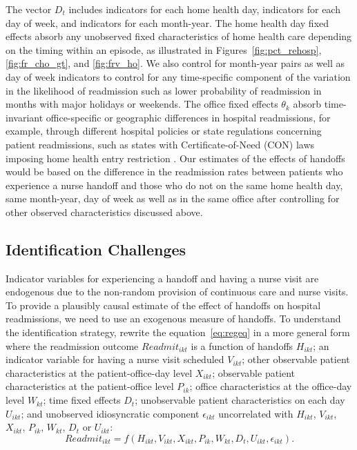 \documentclass[final,12pt, notitlepage]{article}
\begin{document}
The vector $D_t$ includes indicators for each home health day, indicators for each day of week, and indicators for each month-year.
The home health day fixed effects absorb any unobserved fixed characteristics of home health care depending on the timing within an episode, as illustrated in Figures~\ref{fig:pct_rehosp}, \ref{fig:fr_cho_gt}, and \ref{fig:frv_ho}.
We also control for month-year pairs as well as day of week indicators to control for any time-specific component of the variation in the likelihood of readmission such as lower probability of readmission in months with major holidays or weekends.
The office fixed effects $\theta_k$ absorb time-invariant office-specific or geographic differences in hospital readmissions, for example, through different hospital policies or state regulations concerning patient readmissions, such as states with Certificate-of-Need (CON) laws imposing home health entry restriction \citep{Polsky2014}.
Our estimates of the effects of handoffs would be based on the difference in the readmission rates between patients who experience a nurse handoff and those who do not on the same home health day, same month-year, day of week as well as in the same office after controlling for other observed characteristics discussed above.



\subsection{Identification Challenges} \label{sec:id_challenges}


Indicator variables for experiencing a handoff and having a nurse visit are endogenous due to the non-random provision of continuous care and nurse visits. To provide a plausibly causal estimate of the effect of handoffs on hospital readmissions, we need to use an exogenous measure of handoffs. To understand the identification strategy, rewrite the equation~\eqref{eq:regeq} in a more general form where the readmission outcome $Readmit_{ikt}$ is a function of handoffs $H_{ikt}$;
an indicator variable for having a nurse visit scheduled $V_{ikt}$;
other observable patient characteristics at the patient-office-day level $X_{ikt}$;
observable patient characteristics at the patient-office level $P_{ik}$;
office characteristics at the office-day level $W_{kt}$;
time fixed effects $D_t$;
unobservable patient characteristics on each day $U_{ikt}$;
and unobserved idiosyncratic component $\epsilon_{ikt}$ uncorrelated with $H_{ikt}$, $V_{ikt}$, $X_{ikt}$, $P_{ik}$, $W_{kt}$, $D_t$ or $U_{ikt}$:
\begin{equation}\label{eq:y}
Readmit_{ikt} = f(H_{ikt}, V_{ikt}, X_{ikt}, P_{ik}, W_{kt}, D_t, U_{ikt}, \epsilon_{ikt}).
\end{equation}
\end{document}

